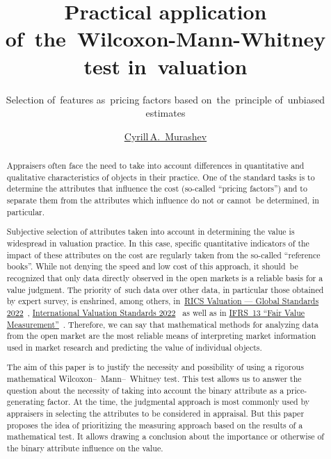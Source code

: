 \documentclass[]{scrreprt}
\title{Practical application of~the~Wilcoxon-Mann-Whitney test in~valuation}
\subtitle{Selection of~features as~pricing factors based on~the~principle of~unbiased estimates}
\author{\href{https://www.facebook.com/groups/1977067932456703}{Cyrill\,A.~Murashev}}
\begin{document}
\maketitle
%
%	
\begin{abstract}
	Appraisers often face the need to take into account differences in quantitative and qualitative characteristics of objects in their practice. One of the standard tasks is to determine the attributes that influence the cost (so-called ``pricing factors'') and to separate them from the attributes which influence do not or cannot~be determined, in particular.
	
	Subjective selection of attributes taken into account in determining the value is widespread in valuation practice. In this case, specific quantitative indicators of the impact of these attributes on the cost are regularly taken from the so-called ``reference books''. While not denying the speed and low cost of this approach, it should~be recognized that only data directly observed in the open markets is a reliable basis for a value judgment. The priority of~such data over other data, in particular those obtained by expert survey, is enshrined, among others, in~\href{https://www.rics.org/uk/upholding-professional-standards/sector-standards/valuation/red-book/red-book-global/}{RICS Valuation --- Global Standards 2022}~\cite{RVGS-2022}, \href{https://www.rics.org/uk/upholding-professional-standards/sector-standards/valuation/red-book/international-valuation-standards/}{International Valuation Standards 2022}~\cite{IVS-2022} as well as in \href{http://eifrs.ifrs.org/eifrs/bnstandards/en/IFRS13.pdf}{IFRS~13 ``Fair Value Measurement''}~\cite{IFRS-13}. Therefore, we can say that mathematical methods for analyzing data from the open market are the most reliable means of interpreting market information used in market research and predicting the value of individual objects.
	
	The aim of this paper is to justify the necessity and possibility of using a rigorous mathematical Wilcoxon--~Mann--~Whitney test. This test allows us to answer the question about the necessity of taking into account the binary attribute as a price-generating factor. At the time, the judgmental approach is most commonly used by appraisers in selecting the attributes to be considered in appraisal. But this paper proposes the idea of prioritizing the measuring approach based on the results of a mathematical test. It allows drawing a conclusion about the importance or otherwise of the binary attribute influence on the value.
	

\end{abstract}
\end{document}
